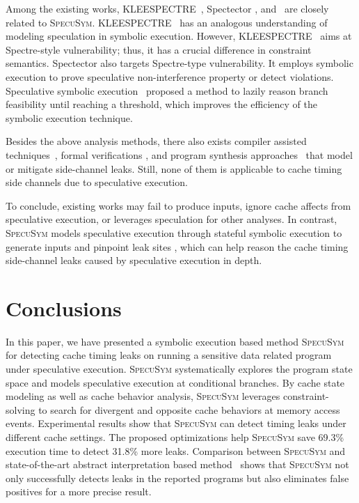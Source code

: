 \documentclass[sigconf]{acmart}
\newcommand\ignore[1]{}
\newcommand{\SpecuSym}{\textsc{SpecuSym} }
\begin{document}
Among the existing works, KLEESPECTRE~\cite{WangCBMR19}, Spectector
\cite{GuarnieriKMRS19}, and~\cite{ZhangCW12} are closely related to 
\textsc{SpecuSym}. KLEESPECTRE~\cite{WangCBMR19} has an analogous 
understanding of modeling speculation in symbolic execution. However, 
KLEESPECTRE~\cite{WangCBMR19} aims at Spectre-style vulnerability; 
thus, it has a crucial difference in constraint semantics. Spectector 
\cite{WangCBMR19} also targets Spectre-type vulnerability. It employs 
symbolic execution to prove speculative non-interference property or 
detect violations. Speculative symbolic execution~\cite{ZhangCW12} 
proposed a method to lazily reason branch feasibility until reaching 
a threshold, which improves the efficiency of the symbolic execution 
technique.



Besides the above analysis methods, there also exists compiler assisted 
techniques~\cite{DoychevK17,WangS17,SungPW18,WuGSW18,WangSW19}, formal 
verifications 
\cite{EldibWS14,EldibWTS14,ChenFD17,SousaD16,AntoGHKTW17,ZhangGSW18}, 
and program synthesis approaches~\cite{MaffeiR17,EldibW14,EldibWW16}
that model or mitigate side-channel leaks. Still, none of them is 
applicable to cache timing side channels due to speculative execution.



\ignore{
Doychev et al.~\cite{DoychevK17}studied that compiler optimization can 
remove cache side channels. Sung et al.~\cite{SungPW18} developed a 
compiler frontend transformation that models cache timing behaviors 
for verification purposes.
}


To conclude, existing works may fail to produce inputs, ignore cache 
affects from speculative execution, or leverages speculation for other 
analyses. In contrast, \SpecuSym models speculative execution through 
stateful symbolic execution to generate inputs and pinpoint leak sites 
, which can help reason the cache timing side-channel leaks caused
by speculative execution in depth. 


\section{Conclusions}
\label{sec:conclusion}


In this paper, we have presented a symbolic execution based method 
\SpecuSym for detecting cache timing leaks on running a sensitive data 
related program under speculative execution. \SpecuSym systematically 
explores the program state space and models speculative execution at 
conditional branches. By cache state modeling as well as cache behavior 
analysis, \SpecuSym leverages constraint-solving to search for divergent 
and opposite cache behaviors at memory access events. Experimental results
show that \SpecuSym can detect timing leaks under different cache settings.
The proposed optimizations help \SpecuSym save 69.3\% execution time to 
detect 31.8\% more leaks. Comparison between \SpecuSym and state-of-the-art 
abstract interpretation based method~\cite{WuW19} shows that \SpecuSym not 
only successfully detects leaks in the reported programs but also eliminates 
false positives for a more precise result.
\end{document}
